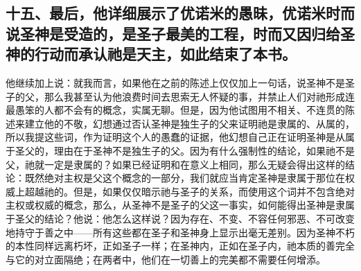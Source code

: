 
\subsection{十五、最后，他详细展示了优诺米的愚昧，优诺米时而说圣神是受造的，是圣子最美的工程，时而又因归给圣神的行动而承认祂是天主，如此结束了本书。}

他继续加上说：就我而言，如果他在之前的陈述上仅仅加上一句话，说圣神不是圣子的父，那么我甚至认为他浪费时间去思索无人怀疑的事，并禁止人们对祂形成连最愚笨的人都不会有的概念，实属无聊。但是，因为他试图用不相关、不连贯的陈述来建立他的不敬，幻想通过否认圣神是独生子的父来证明祂是隶属的、从属的，所以我提这些词，作为证明这个人的愚蠢的证据，他幻想自己正在证明圣神是从属于圣父的，理由在于圣神不是独生子的父。因为有什么强制性的结论，如果祂不是父，祂就一定是隶属的？如果已经证明和在意义上相同，那么无疑会得出这样的结论：既然绝对主权是父这个概念的一部分，我们就应当肯定圣神是隶属于那位在权威上超越祂的。但是，如果仅仅暗示祂与圣子的关系，而使用这个词并不包含绝对主权或权威的概念，那么，从圣神不是圣子的父这一事实，如何能得出圣神是隶属于圣父的结论？他说：他怎么这样说？因为存在、不变、不容任何邪恶、不可改变地持守于善之中——所有这些都在圣子和圣神身上显示出毫无差别。因为圣神不朽的本性同样远离朽坏，正如圣子一样；在圣神内，正如在圣子内，祂本质的善完全与它的对立面隔绝；在两者中，他们在一切善上的完美都不需要任何增添。\par

